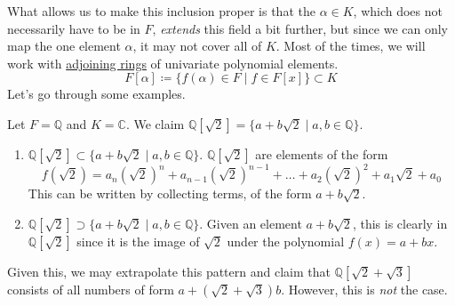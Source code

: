   What allows us to make this inclusion proper is that the $\alpha \in K$, which does not necessarily have to be in $F$, \textit{extends} this field a bit further, but since we can only map the one element $\alpha$, it may not cover all of $K$. Most of the times, we will work with \hyperref[def:adjoining_ring]{adjoining rings} of univariate polynomial elements. 
  \begin{equation}
    F[\alpha] \coloneqq \{ f(\alpha) \in F \mid f \in F[x]\} \subset K
  \end{equation} 
  Let's go through some examples.

  \begin{example}
    \label{ex:radical-extensions-of-sqrt2}
    Let $F = \mathbb{Q}$ and $K = \mathbb{C}$. We claim $\mathbb{Q}[\sqrt{2}] = \{a + b \sqrt{2} \mid a, b \in \mathbb{Q} \}$.
    \begin{enumerate}
      \item $\mathbb{Q}[\sqrt{2}] \subset \{a + b \sqrt{2} \mid a, b \in \mathbb{Q} \}$. $\mathbb{Q}[\sqrt{2}]$ are elements of the form
      \begin{equation}
        f(\sqrt{2}) = a_n (\sqrt{2})^n + a_{n-1} (\sqrt{2})^{n-1} + \ldots + a_2 (\sqrt{2})^2 + a_1 \sqrt{2} + a_0
      \end{equation} 
      This can be written by collecting terms, of the form $a + b \sqrt{2}$. 

      \item $\mathbb{Q}[\sqrt{2}] \supset \{a + b \sqrt{2} \mid a, b \in \mathbb{Q} \}$. Given an element $a + b \sqrt{2}$, this is clearly in $\mathbb{Q}[\sqrt{2}]$ since it is the image of $\sqrt{2}$ under the polynomial $f(x) = a + bx$. 
    \end{enumerate}
  \end{example} 

  Given this, we may extrapolate this pattern and claim that $\mathbb{Q}[\sqrt{2} + \sqrt{3}]$ consists of all numbers of form $a + (\sqrt{2} + \sqrt{3}) b$. However, this is \textit{not} the case. 

